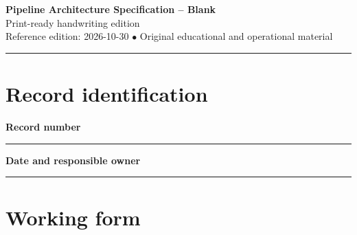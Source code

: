 \documentclass[10pt,letterpaper]{article}
\begin{document}
\begin{center}
{\LARGE\bfseries\color{cdblue}Pipeline Architecture Specification -- Blank}\\[7pt]
{\large Print-ready handwriting edition}\\[6pt]
{\small Reference edition: 2026-10-30 $\bullet$ Original educational and operational material}
\end{center}
\noindent\color{cdblue}\rule{\linewidth}{1.2pt}\color{black}
\vspace{0.4em}
\section{Record identification}
\textbf{Record number}\par
\noindent\rule{\linewidth}{0.35pt}\par\vspace{0.7em}
\textbf{Date and responsible owner}\par
\noindent\rule{\linewidth}{0.35pt}\par\vspace{0.7em}

\section{Working form}
\end{document}
